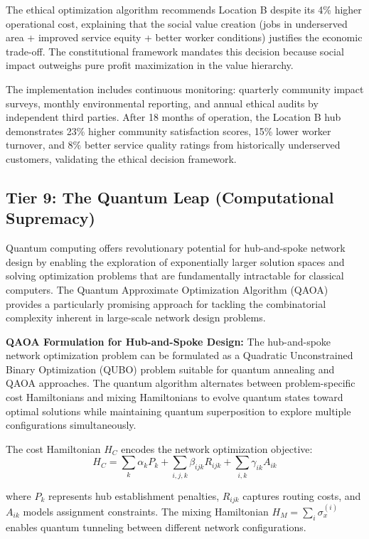 \documentclass{article}
\begin{document}
The ethical optimization algorithm recommends Location B despite its 4\% higher operational cost, explaining that the social value creation (jobs in underserved area + improved service equity + better worker conditions) justifies the economic trade-off. The constitutional framework mandates this decision because social impact outweighs pure profit maximization in the value hierarchy.

The implementation includes continuous monitoring: quarterly community impact surveys, monthly environmental reporting, and annual ethical audits by independent third parties. After 18 months of operation, the Location B hub demonstrates 23\% higher community satisfaction scores, 15\% lower worker turnover, and 8\% better service quality ratings from historically underserved customers, validating the ethical decision framework.

\subsection{Tier 9: The Quantum Leap (Computational Supremacy)}

Quantum computing offers revolutionary potential for hub-and-spoke network design by enabling the exploration of exponentially larger solution spaces and solving optimization problems that are fundamentally intractable for classical computers. The Quantum Approximate Optimization Algorithm (QAOA) provides a particularly promising approach for tackling the combinatorial complexity inherent in large-scale network design problems.

\textbf{QAOA Formulation for Hub-and-Spoke Design:}
The hub-and-spoke network optimization problem can be formulated as a Quadratic Unconstrained Binary Optimization (QUBO) problem suitable for quantum annealing and QAOA approaches. The quantum algorithm alternates between problem-specific cost Hamiltonians and mixing Hamiltonians to evolve quantum states toward optimal solutions while maintaining quantum superposition to explore multiple configurations simultaneously.

The cost Hamiltonian \( H_C \) encodes the network optimization objective:
\[
H_C = \sum_{k} \alpha_k P_k + \sum_{i,j,k} \beta_{ijk} R_{ijk} + \sum_{i,k} \gamma_{ik} A_{ik}
\]

where \( P_k \) represents hub establishment penalties, \( R_{ijk} \) captures routing costs, and \( A_{ik} \) models assignment constraints. The mixing Hamiltonian \( H_M = \sum_i \sigma_x^{(i)} \) enables quantum tunneling between different network configurations.
\end{document}
